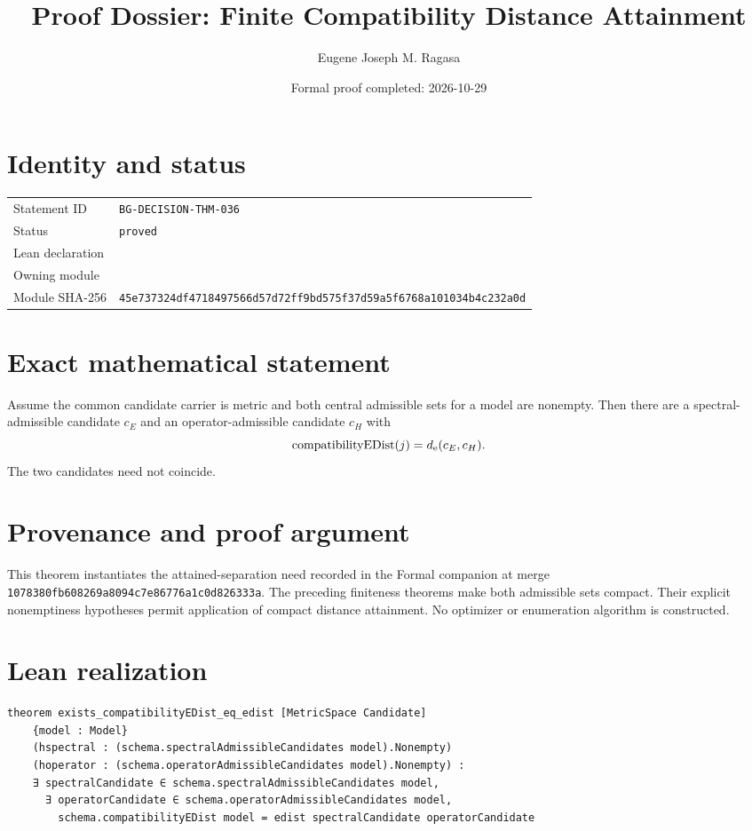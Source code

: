 \documentclass[11pt]{article}
\title{Proof Dossier: Finite Compatibility Distance Attainment}
\author{Eugene Joseph M. Ragasa}
\date{Formal proof completed: 2026-10-29}
\begin{document}
\maketitle
\section{Identity and status}
\begin{tabularx}{\textwidth}{@{}lY@{}}\toprule
Statement ID & \texttt{BG-DECISION-THM-036} \\
Status & \texttt{proved} \\
Lean declaration &  \\
Owning module &  \\
Module SHA-256 & \texttt{45e737324df4718497566d57d72ff9bd575f37d59a5f6768a101034b4c232a0d} \\
\bottomrule\end{tabularx}
\section{Exact mathematical statement}
Assume the common candidate carrier is metric and both central admissible sets for a
model are nonempty. Then there are a spectral-admissible candidate $c_E$ and an
operator-admissible candidate $c_H$ with
\[
  \operatorname{compatibilityEDist}(j)=d_{\rm e}(c_E,c_H).
\]
The two candidates need not coincide.
\section{Provenance and proof argument}
This theorem instantiates the attained-separation need recorded in the Formal companion
at merge \texttt{1078380fb608269a8094c7e86776a1c0d826333a}. The preceding finiteness
theorems make both admissible sets compact. Their explicit nonemptiness hypotheses permit
application of compact distance attainment. No optimizer or enumeration algorithm is
constructed.
\section{Lean realization}
\begin{lstlisting}
theorem exists_compatibilityEDist_eq_edist [MetricSpace Candidate]
    {model : Model}
    (hspectral : (schema.spectralAdmissibleCandidates model).Nonempty)
    (hoperator : (schema.operatorAdmissibleCandidates model).Nonempty) :
    ∃ spectralCandidate ∈ schema.spectralAdmissibleCandidates model,
      ∃ operatorCandidate ∈ schema.operatorAdmissibleCandidates model,
        schema.compatibilityEDist model = edist spectralCandidate operatorCandidate
\end{lstlisting}
\end{document}
